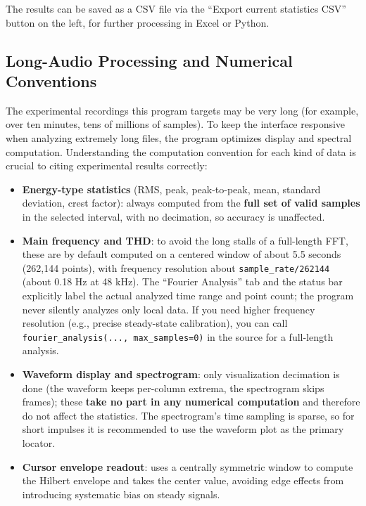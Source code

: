 \documentclass[UTF8,a4paper,12pt]{ctexart}
\begin{document}
The results can be saved as a CSV file via the ``Export current statistics CSV'' button on the left, for further processing in Excel or Python.

\subsection{Long-Audio Processing and Numerical Conventions}

The experimental recordings this program targets may be very long (for example, over ten minutes, tens of millions of samples). To keep the interface responsive when analyzing extremely long files, the program optimizes display and spectral computation. Understanding the computation convention for each kind of data is crucial to citing experimental results correctly:

\begin{itemize}
  \item \textbf{Energy-type statistics} (RMS, peak, peak-to-peak, mean, standard deviation, crest factor): always computed from the \textbf{full set of valid samples} in the selected interval, with no decimation, so accuracy is unaffected.
  \item \textbf{Main frequency and THD}: to avoid the long stalls of a full-length FFT, these are by default computed on a centered window of about 5.5 seconds (262{,}144 points), with frequency resolution about \texttt{sample\_rate/262144} (about 0.18 Hz at 48 kHz). The ``Fourier Analysis'' tab and the status bar explicitly label the actual analyzed time range and point count; the program never silently analyzes only local data. If you need higher frequency resolution (e.g., precise steady-state calibration), you can call \texttt{fourier\_analysis(..., max\_samples=0)} in the source for a full-length analysis.
  \item \textbf{Waveform display and spectrogram}: only visualization decimation is done (the waveform keeps per-column extrema, the spectrogram skips frames); these \textbf{take no part in any numerical computation} and therefore do not affect the statistics. The spectrogram's time sampling is sparse, so for short impulses it is recommended to use the waveform plot as the primary locator.
  \item \textbf{Cursor envelope readout}: uses a centrally symmetric window to compute the Hilbert envelope and takes the center value, avoiding edge effects from introducing systematic bias on steady signals.
\end{itemize}
\end{document}
